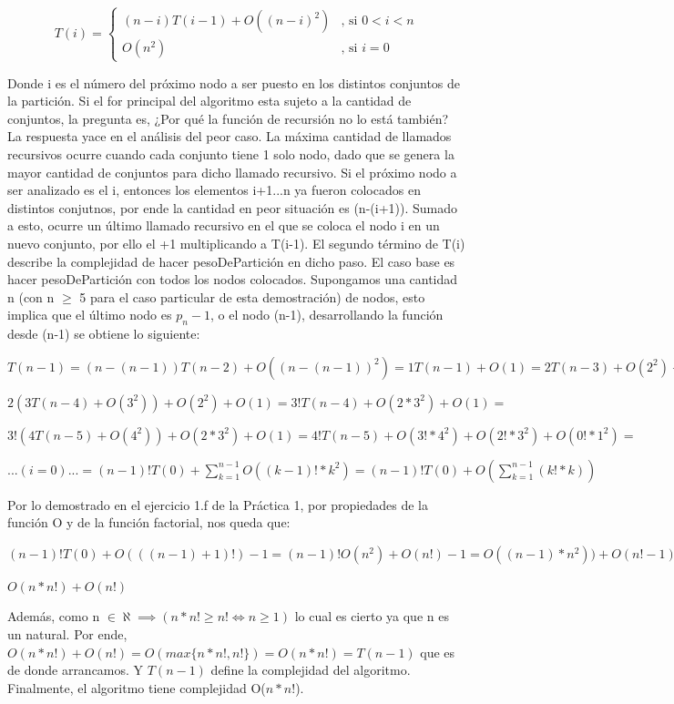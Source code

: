 \documentclass[10pt,a4paper]{article}
\begin{document}
\[ T(i) = \left\{ \begin{array}{ll}
         (n-i)T(i-1) + O((n-i)^2) & \mbox{, si $0 < i < n$}\\
         O(n^2) & \mbox{, si $i = 0$}\end{array} \right. \]       

Donde i es el número del próximo nodo a ser puesto en los distintos conjuntos de la partición. Si el for principal del algoritmo esta sujeto a la cantidad de conjuntos, la pregunta es, ¿Por qué la función de recursión no lo está también? La respuesta yace en el análisis del peor caso. La máxima cantidad de llamados recursivos ocurre cuando cada conjunto tiene 1 solo nodo, dado que se genera la mayor cantidad de conjuntos para dicho llamado recursivo. Si el próximo nodo a ser analizado es el i, entonces los elementos i+1...n ya fueron colocados en distintos conjutnos, por ende la cantidad en peor situación es (n-(i+1)). Sumado a esto, ocurre un último llamado recursivo en el que se coloca el nodo i en un nuevo conjunto, por ello el +1 multiplicando a T(i-1). El segundo término de T(i) describe la complejidad de hacer pesoDePartición en dicho paso. El caso base es hacer pesoDePartición con todos los nodos colocados.\newline
\indent Supongamos una cantidad n (con n $\geq$ 5 para el caso particular de esta demostración) de nodos, esto implica que el último nodo es $p_n-1$, o el nodo (n-1), desarrollando la función desde (n-1) se obtiene lo siguiente:

$T(n-1) = (n-(n-1))T(n-2) + O((n-(n-1))^2) = 1T(n-1) + O(1) = 2T(n-3) + O(2^2) + O(1) = $

$2(3T(n-4) + O(3^2)) + O(2^2) + O(1) = 3!T(n-4) + O(2*3^2) + O(1) = $

$3!(4T(n-5) + O(4^2)) + O(2*3^2) + O(1) = 4!T(n-5) + O(3!*4^2) + O(2!*3^2) + O(0!*1^2) =$

$...(i = 0)... = (n-1)!T(0) + \sum\limits_{k=1}^{n-1} O((k-1)!*k^2) = (n-1)!T(0) + O(\sum\limits_{k=1}^{n-1} (k!*k))$

Por lo demostrado en el ejercicio 1.f de la Práctica 1, por propiedades de la función O y de la función factorial, nos queda que:

$(n-1)!T(0) + O(((n-1)+1)!) - 1 = (n-1)!O(n^2) + O(n!) - 1 = O((n-1)*n^2)) + O(n! - 1) =$

$O(n*n!) + O(n!)$

Además, como n $\in \aleph \implies ( n*n! \geq n! \iff n \geq 1)$ lo cual es cierto ya que n es un natural.
Por ende, $O(n*n!) + O(n!) = O(max\{n*n!,n!\}) = O(n*n!) = T(n-1)$ que es de donde arrancamos. Y $T(n-1)$ define la complejidad del algoritmo. Finalmente, el algoritmo tiene complejidad O($n*n!$). 
\end{document}
